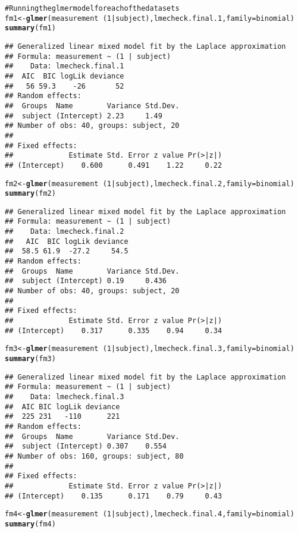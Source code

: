 \documentclass{article}\usepackage{graphicx, color}
\makeatletter
\newcommand{\hlfunctioncall}[1]{\textcolor[rgb]{0.501960784313725,0,0.329411764705882}{\textbf{#1}}}%
\newcommand{\hlcomment}[1]{\textcolor[rgb]{0.180392156862745,0.6,0.341176470588235}{#1}}%
\newenvironment{kframe}{%
 \def\at@end@of@kframe{}%
 \ifinner\ifhmode%
  \def\at@end@of@kframe{\end{minipage}}%
  \begin{minipage}{\columnwidth}%
 \fi\fi%
 \def\FrameCommand##1{\hskip\@totalleftmargin \hskip-\fboxsep
 \colorbox{shadecolor}{##1}\hskip-\fboxsep
     \hskip-\linewidth \hskip-\@totalleftmargin \hskip\columnwidth}%
 \MakeFramed {\advance\hsize-\width
   \@totalleftmargin\z@ \linewidth\hsize
   \@setminipage}}%
 {\par\unskip\endMakeFramed%
 \at@end@of@kframe}
\newenvironment{knitrout}{}{} %
\makeatother
\begin{document}
\begin{knitrout}
\begin{kframe}
\begin{alltt}
\hlcomment{# Running the glmer model for each of the data sets}
fm1 <- \hlfunctioncall{glmer}(measurement ~ (1 | subject), lmecheck.final.1, family = binomial)
\hlfunctioncall{summary}(fm1)
\end{alltt}
\begin{verbatim}
## Generalized linear mixed model fit by the Laplace approximation 
## Formula: measurement ~ (1 | subject) 
##    Data: lmecheck.final.1 
##  AIC  BIC logLik deviance
##   56 59.3    -26       52
## Random effects:
##  Groups  Name        Variance Std.Dev.
##  subject (Intercept) 2.23     1.49    
## Number of obs: 40, groups: subject, 20
## 
## Fixed effects:
##             Estimate Std. Error z value Pr(>|z|)
## (Intercept)    0.600      0.491    1.22     0.22
\end{verbatim}
\begin{alltt}
fm2 <- \hlfunctioncall{glmer}(measurement ~ (1 | subject), lmecheck.final.2, family = binomial)
\hlfunctioncall{summary}(fm2)
\end{alltt}
\begin{verbatim}
## Generalized linear mixed model fit by the Laplace approximation 
## Formula: measurement ~ (1 | subject) 
##    Data: lmecheck.final.2 
##   AIC  BIC logLik deviance
##  58.5 61.9  -27.2     54.5
## Random effects:
##  Groups  Name        Variance Std.Dev.
##  subject (Intercept) 0.19     0.436   
## Number of obs: 40, groups: subject, 20
## 
## Fixed effects:
##             Estimate Std. Error z value Pr(>|z|)
## (Intercept)    0.317      0.335    0.94     0.34
\end{verbatim}
\begin{alltt}
fm3 <- \hlfunctioncall{glmer}(measurement ~ (1 | subject), lmecheck.final.3, family = binomial)
\hlfunctioncall{summary}(fm3)
\end{alltt}
\begin{verbatim}
## Generalized linear mixed model fit by the Laplace approximation 
## Formula: measurement ~ (1 | subject) 
##    Data: lmecheck.final.3 
##  AIC BIC logLik deviance
##  225 231   -110      221
## Random effects:
##  Groups  Name        Variance Std.Dev.
##  subject (Intercept) 0.307    0.554   
## Number of obs: 160, groups: subject, 80
## 
## Fixed effects:
##             Estimate Std. Error z value Pr(>|z|)
## (Intercept)    0.135      0.171    0.79     0.43
\end{verbatim}
\begin{alltt}
fm4 <- \hlfunctioncall{glmer}(measurement ~ (1 | subject), lmecheck.final.4, family = binomial)
\hlfunctioncall{summary}(fm4)

\end{alltt}
\end{kframe}
\end{knitrout}
\end{document}
